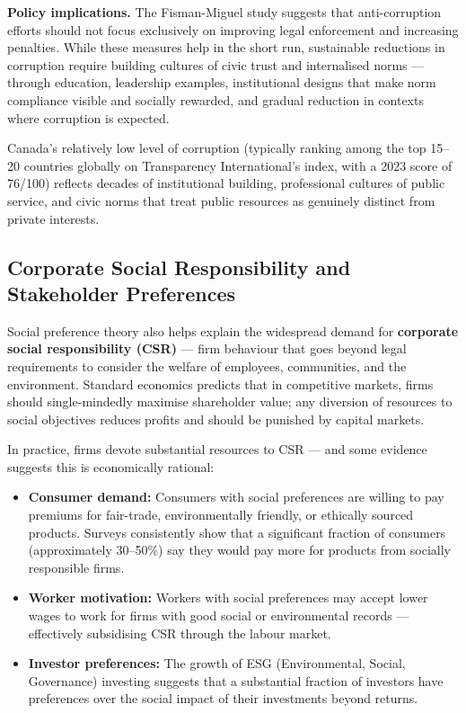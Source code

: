 \documentclass[12pt, letterpaper]{article}
\begin{document}
\textbf{Policy implications.} The Fisman-Miguel study suggests that anti-corruption efforts should not focus exclusively on improving legal enforcement and increasing penalties. While these measures help in the short run, sustainable reductions in corruption require building cultures of civic trust and internalised norms --- through education, leadership examples, institutional designs that make norm compliance visible and socially rewarded, and gradual reduction in contexts where corruption is expected.

Canada's relatively low level of corruption (typically ranking among the top 15--20 countries globally on Transparency International's index, with a 2023 score of 76/100) reflects decades of institutional building, professional cultures of public service, and civic norms that treat public resources as genuinely distinct from private interests.


\subsection{Corporate Social Responsibility and Stakeholder Preferences}


Social preference theory also helps explain the widespread demand for \textbf{corporate social responsibility (CSR)} --- firm behaviour that goes beyond legal requirements to consider the welfare of employees, communities, and the environment. Standard economics predicts that in competitive markets, firms should single-mindedly maximise shareholder value; any diversion of resources to social objectives reduces profits and should be punished by capital markets.

In practice, firms devote substantial resources to CSR --- and some evidence suggests this is economically rational:

\begin{itemize}
\item \textbf{Consumer demand:} Consumers with social preferences are willing to pay premiums for fair-trade, environmentally friendly, or ethically sourced products. Surveys consistently show that a significant fraction of consumers (approximately 30--50\%) say they would pay more for products from socially responsible firms.
\item \textbf{Worker motivation:} Workers with social preferences may accept lower wages to work for firms with good social or environmental records --- effectively subsidising CSR through the labour market.
\item \textbf{Investor preferences:} The growth of ESG (Environmental, Social, Governance) investing suggests that a substantial fraction of investors have preferences over the social impact of their investments beyond returns.
\end{itemize}
\end{document}
